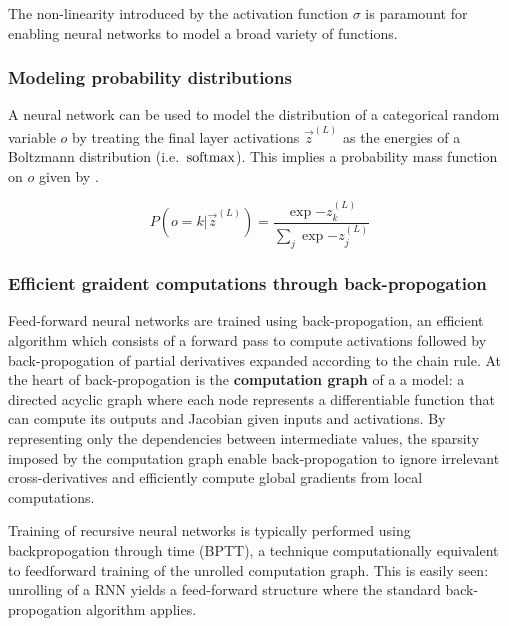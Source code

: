 The non-linearity introduced by the activation function $\sigma$ is paramount
for enabling neural networks to model a broad variety of functions. 

\subsubsection{Modeling probability distributions}

A neural network can be used to model the distribution of a categorical random
variable $o$ by treating the final layer activations $\vec{z}^{(L)}$ as the
energies of a Boltzmann distribution (i.e.\ $\operatorname*{softmax}$). This implies a
probability mass function on $o$ given by .

\begin{equation}
    \label{eq:softmax}
    P(o = k | \vec{z}^{(L)}) = \frac{\exp{-z^{(L)}_k}}{ \sum_{j} \exp{-z^{(L)}_j} }
\end{equation}

\subsubsection{Efficient graident computations through back-propogation}

Feed-forward neural networks are trained using back-propogation, an efficient
algorithm which consists of a forward pass to compute activations followed by
back-propogation of partial derivatives expanded according to the chain
rule. At the heart of back-propogation is the
\textbf{computation graph} of a a model: a directed acyclic graph where each
node represents a differentiable function that can compute its outputs and
Jacobian given inputs and activations. By representing only
the dependencies between intermediate values, the sparsity imposed by the
computation graph enable back-propogation to ignore irrelevant
cross-derivatives and efficiently compute global gradients from local
computations.


Training of recursive neural networks is typically performed using
backpropogation through time (BPTT), a technique computationally
equivalent to feedforward training of the unrolled computation graph. This is
easily seen: unrolling of a RNN yields a feed-forward structure where the
standard back-propogation algorithm applies.




